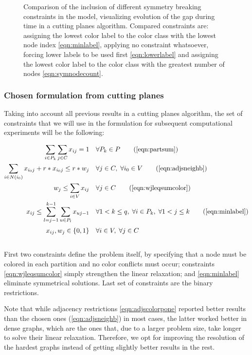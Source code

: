 \begin{figure}
\caption{Comparison of the inclusion of different symmetry breaking constraints in the model, visualizing evolution of the gap during time in a cutting planes algorithm. Compared constraints are: assigning the lowest color label to the color class with the lowest node index \eqref{eqn:minlabel}, applying no constraint whatsoever, forcing lower labels to be used first \eqref{eqn:lowerlabel} and assigning the lowest color label to the color class with the greatest number of nodes \eqref{eqn:symnodecount}.}
\label{fig:models:sym}
\end{figure}


\subsubsection{Chosen formulation from cutting planes}
\label{subsubsec:results:model:chosen}

Taking into account all previous results in a cutting planes algorithm, the set of constraints that we will use in the \PCP{} formulation for subsequent computational experiments will be the following:

\begin{align}
\sum_{i \in P_k} \sum_{j \in C} x_{ij} = 1 \quad &\forall P_k \in P \tag{\ref{eqn:partsum}} \\
 \sum_{i \in N(i_0)} x_{i_0j} + r * x_{i_0j} \leq r * w_j \quad &\forall j \in C, \; \forall i_0 \in V \tag{\ref{eqn:adjsneighb}} \\
 w_j \leq \sum_{i \in V} x_{ij} \quad &\forall j \in C \tag{\ref{eqn:wjleqsumcolor}} \\
 x_{ij} \leq \sum_{l = j-1}^{k-1} \sum_{u \in P_l} x_{uj-1} \quad &\forall 1 < k \leq q, \; \forall i \in P_k, \; \forall 1 < j \leq k \tag{\ref{eqn:minlabel}} \\
  x_{ij}, w_{j} \in \{0,1\} \quad &\forall i \in V, \; \forall j \in C \sumheight \nonumber
\end{align}

First two constraints define the problem itself, by specifying that a node must be colored in each partition and no color conflicts must occur; constraints \ref{eqn:wjleqsumcolor} simply strengthen the linear relaxation; and \ref{eqn:minlabel} eliminate symmetrical solutions. Last set of constraints are the binary restrictions.

Note that while adjacency restrictions \ref{eqn:adjscolorpone} reported better results than the chosen ones (\ref{eqn:adjsneighb}) in most cases, the latter worked better in dense graphs, which are the ones that, due to a larger problem size, take longer to solve their linear relaxation. Therefore, we opt for improving the resolution of the hardest graphs instead of getting slightly better results in the rest. 

